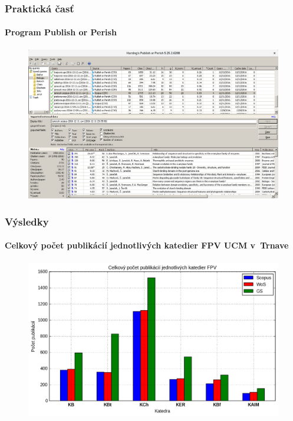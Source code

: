 \documentclass{beamer}
\begin{document}
\begin{frame}
  \frametitle{Praktická časť}
  \framesubtitle{Program Publish or Perish}
  \begin{figure}
    \centering
    \includegraphics[scale=0.25]{publish-or-perish_wine.png}
    \caption{\citet{Harzing2011}}
  \end{figure}
\end{frame}


\begin{frame}
  \frametitle{Výsledky}
  \framesubtitle{Celkový počet publikácií jednotlivých katedier FPV UCM v~Trnave}
  \begin{figure}
    \centering
    \includegraphics[scale=0.5]{plot-results-data-papers.png}
  \end{figure}
\end{frame}
\end{document}
